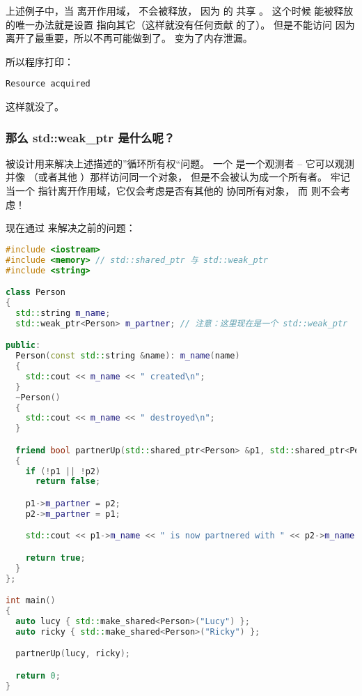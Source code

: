 \documentclass[../../LearnCpp.tex]{subfiles}
\begin{document}
上述例子中，当  离开作用域， 不会被释放，
因为  的  共享 。
这个时候  能被释放的唯一办法就是设置  指向其它（这样就没有任何贡献  的了）。
但是不能访问  因为  离开了最重要，所以不再可能做到了。
 变为了内存泄漏。

所以程序打印：

\begin{lstlisting}
Resource acquired
\end{lstlisting}

这样就没了。

\subsubsection*{那么 std::weak\_ptr 是什么呢？}

 被设计用来解决上述描述的”循环所有权“问题。
一个  是一个观测者 --
它可以观测并像 （或者其他 ）那样访问同一个对象，
但是不会被认为成一个所有者。
牢记当一个  指针离开作用域，它仅会考虑是否有其他的  协同所有对象，
而  则不会考虑！

现在通过  来解决之前的问题：

\begin{lstlisting}[language=C++]
#include <iostream>
#include <memory> // std::shared_ptr 与 std::weak_ptr
#include <string>

class Person
{
  std::string m_name;
  std::weak_ptr<Person> m_partner; // 注意：这里现在是一个 std::weak_ptr

public:
  Person(const std::string &name): m_name(name)
  {
    std::cout << m_name << " created\n";
  }
  ~Person()
  {
    std::cout << m_name << " destroyed\n";
  }

  friend bool partnerUp(std::shared_ptr<Person> &p1, std::shared_ptr<Person> &p2)
  {
    if (!p1 || !p2)
      return false;

    p1->m_partner = p2;
    p2->m_partner = p1;

    std::cout << p1->m_name << " is now partnered with " << p2->m_name << '\n';

    return true;
  }
};

int main()
{
  auto lucy { std::make_shared<Person>("Lucy") };
  auto ricky { std::make_shared<Person>("Ricky") };

  partnerUp(lucy, ricky);

  return 0;
}
\end{lstlisting}
\end{document}
